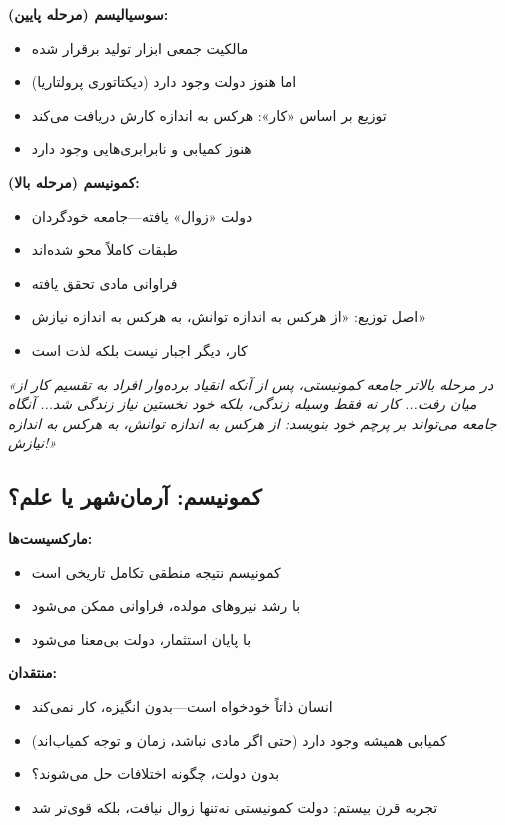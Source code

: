 \begin{defbox}
\textbf{سوسیالیسم (مرحله پایین):}
\begin{itemize}[nosep]
    \item مالکیت جمعی ابزار تولید برقرار شده
    \item اما هنوز دولت وجود دارد (دیکتاتوری پرولتاریا)
    \item توزیع بر اساس «کار»: هرکس به اندازه کارش دریافت می‌کند
    \item هنوز کمیابی و نابرابری‌هایی وجود دارد
\end{itemize}

\textbf{کمونیسم (مرحله بالا):}
\begin{itemize}[nosep]
    \item دولت «زوال» یافته—جامعه خودگردان
    \item طبقات کاملاً محو شده‌اند
    \item فراوانی مادی تحقق یافته
    \item اصل توزیع: «از هرکس به اندازه توانش، به هرکس به اندازه نیازش»
    \item کار، دیگر اجبار نیست بلکه لذت است
\end{itemize}
\end{defbox}

\begin{quotebox}
\textit{«در مرحله بالاتر جامعه کمونیستی، پس از آنکه انقیاد برده‌وار افراد به تقسیم کار از میان رفت... کار نه فقط وسیله زندگی، بلکه خود نخستین نیاز زندگی شد... آنگاه جامعه می‌تواند بر پرچم خود بنویسد: از هرکس به اندازه توانش، به هرکس به اندازه نیازش!»}
\end{quotebox}

\subsection{کمونیسم: آرمان‌شهر یا علم؟}

\begin{debatebox}
\textbf{مارکسیست‌ها:}
\begin{itemize}[nosep]
    \item کمونیسم نتیجه منطقی تکامل تاریخی است
    \item با رشد نیروهای مولده، فراوانی ممکن می‌شود
    \item با پایان استثمار، دولت بی‌معنا می‌شود
\end{itemize}

\textbf{منتقدان:}
\begin{itemize}[nosep]
    \item انسان ذاتاً خودخواه است—بدون انگیزه، کار نمی‌کند
    \item کمیابی همیشه وجود دارد (حتی اگر مادی نباشد، زمان و توجه کمیاب‌اند)
    \item بدون دولت، چگونه اختلافات حل می‌شوند؟
    \item تجربه قرن بیستم: دولت کمونیستی نه‌تنها زوال نیافت، بلکه قوی‌تر شد
\end{itemize}
\end{debatebox}

